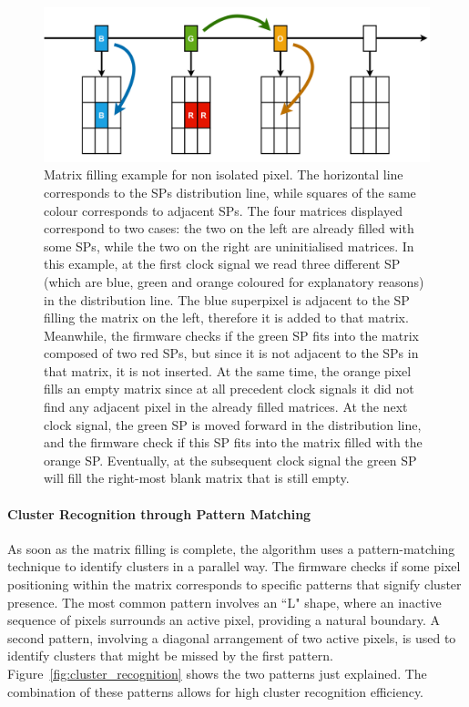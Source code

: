 \begin{figure}
    \centering
    \includegraphics[width=\textwidth]{figures/matrix_filling_clustering.png}
    \caption{Matrix filling example for non isolated pixel. The horizontal line corresponds to the SPs distribution line, while squares of the same colour corresponds to adjacent SPs. The four matrices displayed correspond to two cases: the two on the left are already filled with some SPs, while the two on the right are uninitialised matrices. In this example, at the first clock signal we read three different SP (which are blue, green and orange coloured for explanatory reasons) in the distribution line. The blue superpixel is adjacent to the SP filling the matrix on the left, therefore it is added to that matrix. Meanwhile, the firmware checks if the green SP fits into the matrix composed of two red SPs, but since it is not adjacent to the SPs in that matrix, it is not inserted. At the same time, the orange pixel fills an empty matrix since at all precedent clock signals it did not find any adjacent pixel in the already filled matrices. At the next clock signal, the green SP is moved forward in the distribution line, and the firmware check if this SP fits into the matrix filled with the orange SP. Eventually, at the subsequent clock signal the green SP will fill the right-most blank matrix that is still empty.}
    \label{fig:matrix_filling_clustering}
\end{figure}

\paragraph{Cluster Recognition through Pattern Matching}
As soon as the matrix filling is complete, the algorithm uses a pattern-matching technique to identify clusters in a parallel way. The firmware checks if some pixel positioning within the matrix corresponds to specific patterns that signify cluster presence. The most common pattern involves an ``L" shape, where an inactive sequence of pixels surrounds an active pixel, providing a natural boundary. A second pattern, involving a diagonal arrangement of two active pixels, is used to identify clusters that might be missed by the first pattern. Figure~\ref{fig:cluster_recognition} shows the two patterns just explained. The combination of these patterns allows for high cluster recognition efficiency.


